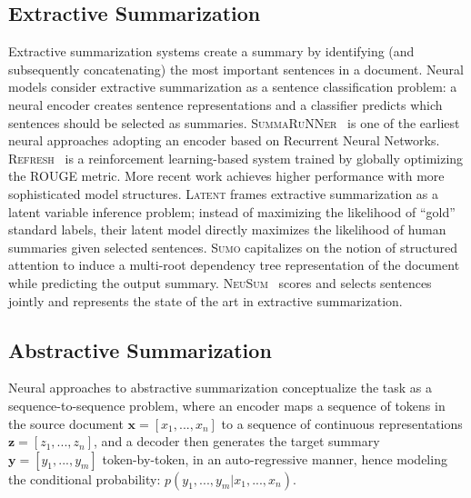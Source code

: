 \documentclass[11pt,a4paper]{article}
\begin{document}
    \subsection{Extractive Summarization}
    \label{sec:extr-summ-1}
    Extractive summarization systems create a summary by identifying (and
    subsequently concatenating) the most important sentences in a
    document.  
    Neural models consider extractive summarization as a sentence
    classification problem: a neural encoder creates sentence
    representations and a classifier predicts which sentences should be
    selected as summaries.
    \textsc{SummaRuNNer}~\cite{nallapati2017summarunner} is one of the
    earliest neural approaches adopting an encoder based on Recurrent
    Neural Networks.  \textsc{Refresh}~\cite{narayan2018ranking} is a
    reinforcement learning-based system trained by globally optimizing the
    ROUGE metric.  More recent work achieves higher performance with more
    sophisticated model structures.  \textsc{Latent}
    \cite{zhang2018neural} frames extractive summarization as a latent
    variable inference problem; instead of maximizing the likelihood of
    ``gold'' standard labels, their latent model directly maximizes the
    likelihood of human summaries given selected sentences.  
    \textsc{Sumo}
    \cite{yang19sumo} capitalizes on the notion of structured attention to
    induce a multi-root dependency tree representation of the document
    while predicting the output summary.
    \textsc{NeuSum}~\cite{zhou2018neural} scores and selects sentences
    jointly and represents the state of the art in extractive
    summarization.
    
    
    \subsection{Abstractive Summarization}
    \label{sec:abstr-summ-1}
    
    Neural approaches to abstractive summarization conceptualize the task
    as a sequence-to-sequence problem,
    where an encoder maps a sequence of tokens in the source document
    $\bm{x} = [x_1, ..., x_n]$ to a sequence of continuous
    representations $\bm{z} = [z_1, ..., z_n]$, and a decoder then
    generates the target summary $\bm{y} = [y_1, ..., y_m]$
    token-by-token, in an auto-regressive manner, hence modeling the
    conditional probability: $p(y_1, ..., y_m|x_1, ..., x_n)$.
    
\end{document}
